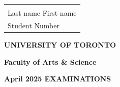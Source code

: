 \documentclass[14pt, oneside]{memoir}
\begin{document}
\begin{tabular}[t]{l}
	\hphantom{Last name Last nameLast nameLast name}\\[-15pt]	
	Last name  \dotfill  First name \dotfill  \\
	Student Number \dotfill  \\
\end{tabular}

\vskip 10pt

{\centering \textbf{UNIVERSITY OF TORONTO} \par}

{\centering \textbf{	Faculty of Arts \& Science} \par}

{\centering \textbf{	April 2025 EXAMINATIONS} \par}
\end{document}
